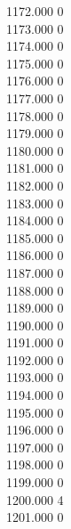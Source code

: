 { 1172.000	0 \\
 1173.000	0 \\
 1174.000	0 \\
 1175.000	0 \\
 1176.000	0 \\
 1177.000	0 \\
 1178.000	0 \\
 1179.000	0 \\
 1180.000	0 \\
 1181.000	0 \\
 1182.000	0 \\
 1183.000	0 \\
 1184.000	0 \\
 1185.000	0 \\
 1186.000	0 \\
 1187.000	0 \\
 1188.000	0 \\
 1189.000	0 \\
 1190.000	0 \\
 1191.000	0 \\
 1192.000	0 \\
 1193.000	0 \\
 1194.000	0 \\
 1195.000	0 \\
 1196.000	0 \\
 1197.000	0 \\
 1198.000	0 \\
 1199.000	0 \\
 1200.000	4 \\
 1201.000	0 \\
}
